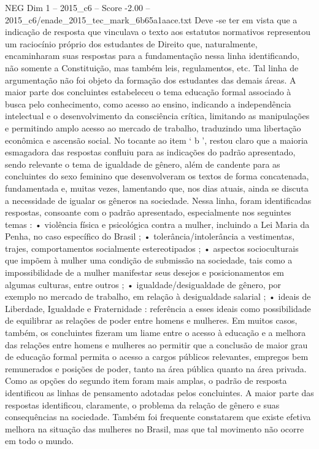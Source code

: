 \begin{textsample}{NEG Dim 1 – 2015\_c6 – Score -2.00 – 2015\_c6/enade\_2015\_tec\_mark\_6b65a1aace.txt}
Deve -se ter em vista que a indicação de resposta que vinculava o texto aos estatutos normativos representou um raciocínio próprio dos estudantes de Direito que, naturalmente, encaminharam suas respostas para a fundamentação nessa linha identificando, não somente a Constituição, mas também leis, regulamentos, etc.
Tal linha de argumentação não foi objeto da formação dos estudantes das demais áreas.
A maior parte dos concluintes estabeleceu o tema educação formal associado à busca pelo conhecimento, como acesso ao ensino, indicando a independência intelectual e o desenvolvimento da consciência crítica, limitando as manipulações e permitindo amplo acesso ao mercado de trabalho, traduzindo uma libertação econômica e ascensão social.
No tocante ao item ‘ b ’, restou claro que a maioria esmagadora das respostas confluiu para as indicações do padrão apresentado, sendo relevante o tema de igualdade de gênero, além de candente para as concluintes do sexo feminino que desenvolveram os textos de forma concatenada, fundamentada e, muitas vezes, lamentando que, nos dias atuais, ainda se discuta a necessidade de igualar os gêneros na sociedade.
Nessa linha, foram identificadas respostas, consoante com o padrão apresentado, especialmente nos seguintes temas : • violência física e psicológica contra a mulher, incluindo a Lei Maria da Penha, no caso específico do Brasil ; • tolerância/intolerância a vestimentas, trajes, comportamentos socialmente estereotipados ; • aspectos socioculturais que impõem à mulher uma condição de submissão na sociedade, tais como a impossibilidade de a mulher manifestar seus desejos e posicionamentos em algumas culturas, entre outros ; • igualdade/desigualdade de gênero, por exemplo no mercado de trabalho, em relação à desigualdade salarial ; • ideais de Liberdade, Igualdade e Fraternidade : referência a esses ideais como possibilidade de equilibrar as relações de poder entre homens e mulheres.
Em muitos casos, também, os concluintes fizeram um liame entre o acesso à educação e a melhora das relações entre homens e mulheres ao permitir que a conclusão de maior grau de educação formal permita o acesso a cargos públicos relevantes, empregos bem remunerados e posições de poder, tanto na área pública quanto na área privada.
Como as opções do segundo item foram mais amplas, o padrão de resposta identificou as linhas de pensamento adotadas pelos concluintes.
A maior parte das respostas identificou, claramente, o problema da relação de gênero e suas consequências na sociedade.
Também foi frequente constatarem que existe efetiva melhora na situação das mulheres no Brasil, mas que tal movimento não ocorre em todo o mundo.

\end{textsample}
